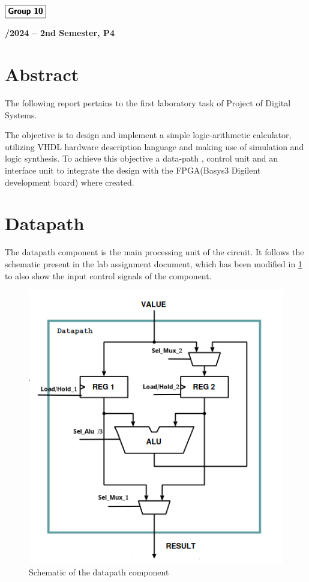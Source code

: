 \documentclass[12pt]{article}
\begin{document}
\begin{flushleft}
    \large $\boxed{\text{\bf \fontfamily{cmss}\selectfont Group 10}}$\\[4.0cm]
\end{flushleft}
    
\begin{center}
    \large \bf {}/2024 -- 2nd Semester, P4
\end{center}

\thispagestyle{empty}

\setcounter{page}{0}

\newpage

\tableofcontents 

\newpage

\section{Abstract}
The following report pertains to the first laboratory task of Project of Digital Systems.

The objective is to design and implement a simple logic-arithmetic calculator, utilizing VHDL hardware description language and making use of simulation and logic synthesis. 
To achieve this objective a data-path , control unit and an interface
unit to integrate the design with the FPGA(Basys3 Digilent development board) where created. 

\section{Datapath}

The datapath component is the main processing unit of the circuit. It follows the schematic present in the lab assignment document, which has been modified in \ref{fig:datapath} to also show the input control signals of the component.

\begin{figure}[H]
	\centering
	\includegraphics[width=0.6\linewidth]{Imagens/datapath.png}
	\caption{Schematic of the datapath component}
	\label{fig:datapath}
\end{figure}
\end{document}

